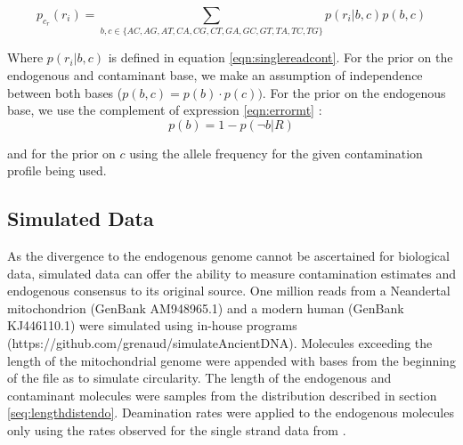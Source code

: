 \documentclass[a4paper,12pt]{article}
\begin{document}
\begin{equation}
p_{c_r}(r_i) = \sum\limits_{ b,c \in \{AC,AG,AT,CA,CG,CT,GA,GC,GT,TA,TC,TG\} } p(r_i|b,c) p(b,c)
\end{equation}

\noindent Where $p(r_i|b,c)$ is defined in equation \ref{eqn:singlereadcont}. For the prior on the endogenous and contaminant base, we make an assumption of independence between both bases ($p(b,c) = p(b) \cdot p(c))$. For the prior on the endogenous base, we use the complement of expression \ref{eqn:errormt} :
\begin{equation}
p(b)  = 1 - p(\neg b|R)
\end{equation}

\noindent  and for the prior on $c$ using the allele frequency for the given contamination profile being used. 





\subsection{Simulated Data}
\label{sec:meth:simulated}

As the divergence to the endogenous genome cannot be ascertained for biological data, simulated data can offer the ability to measure contamination estimates and endogenous consensus to its original source. One million reads from a Neandertal mitochondrion (GenBank AM948965.1) and a modern human (GenBank KJ446110.1) were simulated using in-house programs (https://github.com/grenaud/simulateAncientDNA). Molecules exceeding the length of the mitochondrial genome were appended with bases from the beginning of the file as to simulate circularity. The length of the endogenous and contaminant molecules were samples from the distribution described in section \ref{seq:lengthdistendo}. Deamination rates were applied to the endogenous molecules only using the rates observed for the single strand data from \cite{lazaridis2014ancient}. %
\end{document}
